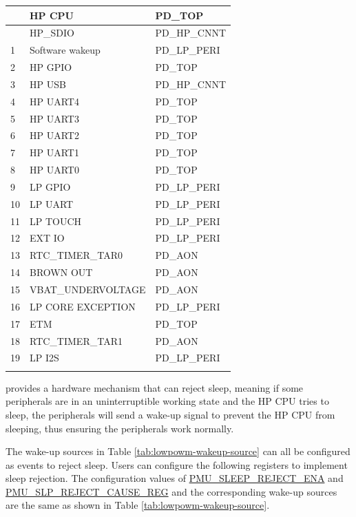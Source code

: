 \documentclass[main\_\_EN.tex]{subfiles}
\begin{document}
\begin{longtable}{ | l | l | l | }
{    23 & HP CPU & PD\_TOP  \\\hline
}{
    0 & HP\_SDIO & PD\_HP\_CNNT  \\\hline
    1 & Software wakeup & PD\_LP\_PERI \\\hline
    2 & HP GPIO   & PD\_TOP  \\\hline
    3 & HP USB  & PD\_HP\_CNNT  \\\hline
    4 & HP UART4 & PD\_TOP \\\hline
    5 & HP UART3 & PD\_TOP  \\\hline
    6 & HP UART2 & PD\_TOP  \\\hline
    7 & HP UART1 & PD\_TOP  \\\hline
    8 & HP UART0 & PD\_TOP  \\\hline
    9 & LP GPIO & PD\_LP\_PERI \\\hline
    10 & LP UART & PD\_LP\_PERI  \\\hline
    11 & LP TOUCH & PD\_LP\_PERI  \\\hline
    12 & EXT IO & PD\_LP\_PERI  \\\hline
    13 & RTC\_TIMER\_TAR0 & PD\_AON  \\\hline
    14 & BROWN OUT & PD\_AON  \\\hline
    15 & VBAT\_UNDERVOLTAGE & PD\_AON  \\\hline
    16 & LP CORE EXCEPTION & PD\_LP\_PERI  \\\hline
    17 & ETM & PD\_TOP  \\\hline
    18 & RTC\_TIMER\_TAR1 & PD\_AON  \\\hline
    19 & LP I2S & PD\_LP\_PERI  \\\hline
}
\end{longtable}

\chipname{} provides a hardware mechanism that can reject sleep, meaning if some peripherals are in an uninterruptible working state and the HP CPU tries to sleep, the peripherals will send a wake-up signal to prevent the HP CPU from sleeping, thus ensuring the peripherals work normally.

The wake-up sources in Table \ref{tab:lowpowm-wakeup-source} can all be configured as events to reject sleep. Users can configure the following registers to implement sleep rejection. The configuration values of \hyperref[fielddesc:PMUSLEEPREJECTENA]{PMU\_SLEEP\_REJECT\_ENA} and \hyperref[fielddesc:PMUREJECTCAUSE]{PMU\_SLP\_REJECT\_CAUSE\_REG} and the corresponding wake-up sources are the same as shown in Table \ref{tab:lowpowm-wakeup-source}.
\end{document}

